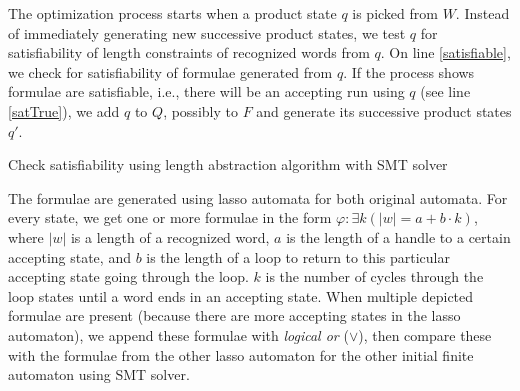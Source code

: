 The optimization process starts when a product state $q$ is picked from $W$. Instead of immediately generating new successive product states, we test $q$ for satisfiability of length constraints of recognized words from $q$. On line \ref{satisfiable}, we check for satisfiability of formulae generated from $q$. If the process shows formulae are satisfiable, i.e., there will be an accepting run using $q$ (see line \ref{satTrue}), we add $q$ to $Q$, possibly to $F$ and generate its successive product states $q'$.

\begin{algorithm}
\caption{Check satisfiability using length abstraction algorithm with SMT solver}\label{checkLengthAbstractionSatisfiabilitySMTAlgorithm}
%

\DontPrintSemicolon
\BlankLine


\end{algorithm}\DecMargin{1em}

The formulae are generated using lasso automata for both original automata. For every state, we get one or more formulae in the form $\varphi: \exists k( |w| = a + b \cdot k)$, where $|w|$ is a length of a recognized word, $a$ is the length of a handle to a certain accepting state, and $b$ is the length of a loop to return to this particular accepting state going through the loop. $k$ is the number of cycles through the loop states until a word ends in an accepting state. When multiple depicted formulae are present (because there are more accepting states in the lasso automaton), we append these formulae with \emph{logical or} ($\lor$), then compare these with the formulae from the other lasso automaton for the other initial finite automaton using SMT solver.

